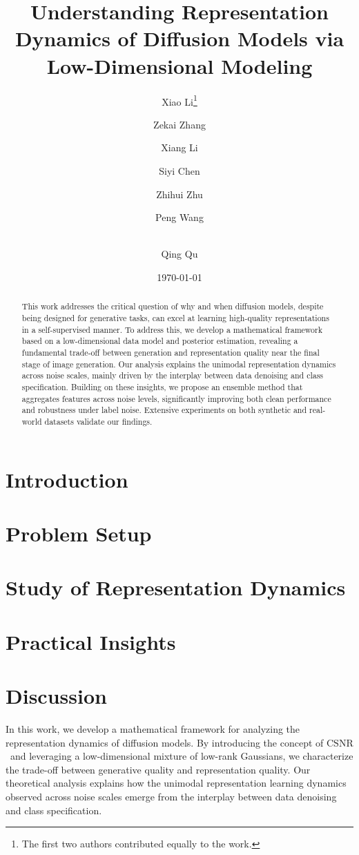 \documentclass[11pt]{article}
\title{Understanding Representation Dynamics of Diffusion Models via Low-Dimensional Modeling}
\author[$\Diamond$]{Xiao Li\thanks{The first two authors contributed equally to the work.}}
\author[$\Diamond$]{Zekai Zhang\samethanks}
\author[$\Diamond$]{Xiang Li}
\author[$\Diamond$]{Siyi Chen}
\author[$\dagger$]{Zhihui Zhu}
\author[$\Diamond$]{Peng Wang}
\author[$\Diamond$]{\\ Qing Qu}
\affil[$\Diamond$]{Department of Electrical Engineering and Computer Science, University of Michigan}
\affil[$\dagger$]{Department of Computer Science \& Engineering, Ohio State University}
\date{}
\date{\today}
\def\CSNR{$\mathrm{CSNR}$}
\begin{document}
\maketitle


\begin{abstract}
This work addresses the critical question of why and when diffusion models, despite being designed for generative tasks, can excel at learning high-quality representations in a self-supervised manner. To address this, we develop a mathematical framework based on a low-dimensional data model and posterior estimation, revealing a fundamental trade-off between generation and representation quality near the final stage of image generation. Our analysis explains the unimodal representation dynamics across noise scales, mainly driven by the interplay between data denoising and class specification. Building on these insights, we propose an ensemble method that aggregates features across noise levels, significantly improving both clean performance and robustness under label noise. Extensive experiments on both synthetic and real-world datasets validate our findings.

\end{abstract}

\section{Introduction}\label{sec:intro}


\section{Problem Setup}\label{sec:problem}


\section{Study of Representation Dynamics}\label{sec:main}


\section{Practical Insights}\label{sec:exp}


\section{Discussion}
In this work, we develop a mathematical framework for analyzing the representation dynamics of diffusion models. By introducing the concept of \CSNR~and leveraging a low-dimensional mixture of low-rank Gaussians, we characterize the trade-off between generative quality and representation quality. Our theoretical analysis explains how the unimodal representation learning dynamics observed across noise scales emerge from the interplay between data denoising and class specification.
\end{document}
